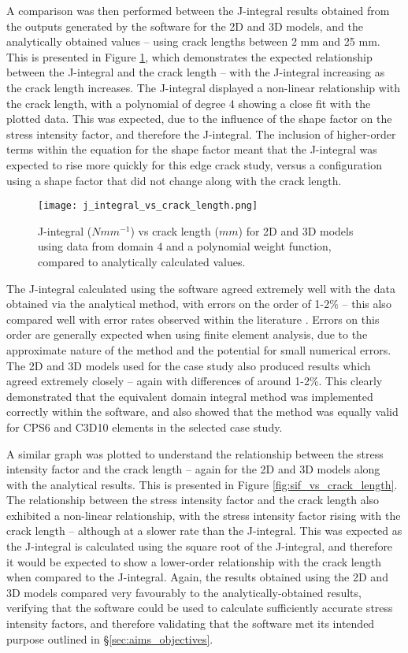 A comparison was then performed between the J-integral results obtained from the outputs generated by the software for the 2D and 3D models, and the analytically obtained values -- using crack lengths between 2 mm and 25 mm. This is presented in Figure \ref{fig:j_integral_vs_crack_length}, which demonstrates the expected relationship between the J-integral and the crack length -- with the J-integral increasing as the crack length increases. The J-integral displayed a non-linear relationship with the crack length, with a polynomial of degree 4 showing a close fit with the plotted data. This was expected, due to the influence of the shape factor on the stress intensity factor, and therefore the J-integral. The inclusion of higher-order terms within the equation for the shape factor meant that the J-integral was expected to rise more quickly for this edge crack study, versus a configuration using a shape factor that did not change along with the crack length.

\begin{figure}[H]
	\centering
	\texttt{[image: j\_integral\_vs\_crack\_length.png]}
	\caption{J-integral ($N mm^{-1}$) vs crack length ($mm$) for 2D and 3D models using data from domain 4 and a polynomial weight function, compared to analytically calculated values.}
	\label{fig:j_integral_vs_crack_length}
\end{figure}

The J-integral calculated using the software agreed extremely well with the data obtained via the analytical method, with errors on the order of 1-2\% -- this also compared well with error rates observed within the literature \cite{yuan_research_2023}. Errors on this order are generally expected when using finite element analysis, due to the approximate nature of the method and the potential for small numerical errors. The 2D and 3D models used for the case study also produced results which agreed extremely closely -- again with differences of around 1-2\%. This clearly demonstrated that the equivalent domain integral method was implemented correctly within the software, and also showed that the method was equally valid for CPS6 and C3D10 elements in the selected case study.

A similar graph was plotted to understand the relationship between the stress intensity factor and the crack length -- again for the 2D and 3D models along with the analytical results. This is presented in Figure \ref{fig:sif_vs_crack_length}. The relationship between the stress intensity factor and the crack length also exhibited a non-linear relationship, with the stress intensity factor rising with the crack length -- although at a slower rate than the J-integral. This was expected as the J-integral is calculated using the square root of the J-integral, and therefore it would be expected to show a lower-order relationship with the crack length when compared to the J-integral. Again, the results obtained using the 2D and 3D models compared very favourably to the analytically-obtained results, verifying that the software could be used to calculate sufficiently accurate stress intensity factors, and therefore validating that the software met its intended purpose outlined in §\ref{sec:aims_objectives}.

